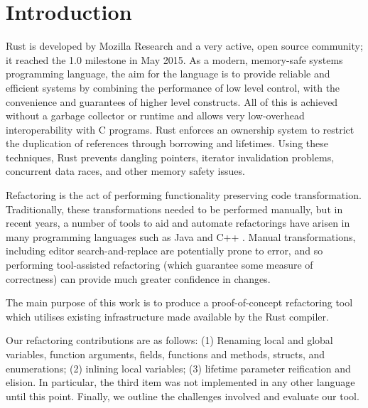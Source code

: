 \section{Introduction}\label{C:intro}

Rust is developed by Mozilla Research and a very active, open source community; it reached the 1.0 milestone in May 2015. As a modern, memory-safe systems programming language, the aim for the language is to provide reliable and efficient systems by combining the performance of low level control, with the convenience and guarantees of higher level constructs. All of this is achieved without a garbage collector or runtime and allows very low-overhead interoperability with C programs. Rust enforces an ownership system to restrict the duplication of references through borrowing and lifetimes. Using these techniques, Rust prevents dangling pointers, iterator invalidation problems, concurrent data races, and other memory safety issues.

Refactoring is the act of performing functionality preserving code transformation. Traditionally, these transformations needed to be performed manually, but in recent years, a number of tools to aid and automate refactorings have arisen in many programming languages such as Java and C++ \cite{brown2008tool}. Manual transformations, including editor search-and-replace are potentially prone to error, and so performing tool-assisted refactoring (which guarantee some measure of correctness) can provide much greater confidence in changes.

The main purpose of this work is to produce a proof-of-concept refactoring tool which utilises existing infrastructure made available by the Rust compiler. 

Our refactoring contributions are as follows: (1) Renaming local and global variables, function arguments, fields, functions and methods, structs, and enumerations; (2) inlining local variables; (3) lifetime parameter reification and elision. In particular, the third item was not implemented in any other language until this point. Finally, we outline the challenges involved and evaluate our tool.